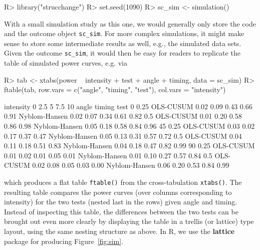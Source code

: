 \documentclass[10pt,a4paper,twoside]{article}
\let\code=\texttt
\let\pkg=\textbf
\let\proglang=\textsf
\newenvironment{Schunk}{}{}
\begin{document}
\begin{Schunk}
\begin{Sinput}
R> library("strucchange")
R> set.seed(1090)
R> sc_sim <- simulation()
\end{Sinput}
\end{Schunk}


With a small simulation study as this one, we would generally only
store the code and the outcome object \code{sc\_sim}. For more complex simulations,
it might make sense to store some intermediate results as well, e.g., the simulated
data sets. Given the outcome \code{sc\_sim}, it would then be easy for readers
to replicate the table of simulated power curves, e.g. via

\begin{Schunk}
\begin{Sinput}
R> tab <- xtabs(power ~ intensity + test + angle + timing, data = sc_sim)
R> ftable(tab, row.vars = c("angle", "timing", "test"), col.vars = "intensity")
\end{Sinput}
\begin{Soutput}
                           intensity    0  2.5    5  7.5   10
angle timing test                                            
0     0.25   OLS-CUSUM               0.02 0.09 0.43 0.66 0.91
             Nyblom-Hansen           0.02 0.07 0.34 0.61 0.82
      0.5    OLS-CUSUM               0.01 0.20 0.58 0.86 0.98
             Nyblom-Hansen           0.05 0.18 0.58 0.84 0.96
45    0.25   OLS-CUSUM               0.03 0.02 0.17 0.37 0.47
             Nyblom-Hansen           0.05 0.13 0.31 0.57 0.72
      0.5    OLS-CUSUM               0.04 0.11 0.18 0.51 0.83
             Nyblom-Hansen           0.04 0.18 0.47 0.82 0.99
90    0.25   OLS-CUSUM               0.01 0.02 0.01 0.05 0.01
             Nyblom-Hansen           0.01 0.10 0.27 0.57 0.84
      0.5    OLS-CUSUM               0.02 0.08 0.05 0.03 0.00
             Nyblom-Hansen           0.06 0.20 0.53 0.84 0.99
\end{Soutput}
\end{Schunk}

which produces a flat table \code{ftable()} from the cross-tabulation \code{xtabs()}.
The resulting table compares the power curves (over columns corresponding to intensity) for the two
tests (nested last in the rows) given angle and timing. Instead of inspecting this
table, the differences between the two tests can be brought out even more clearly
by displaying the table in a trellis (or lattice) type layout, using the same nesting structure
as above. In \proglang{R}, we use the \pkg{lattice} package \citep{repro:Sarkar:2002} for
producing Figure~\ref{fig:sim}.
\end{document}
